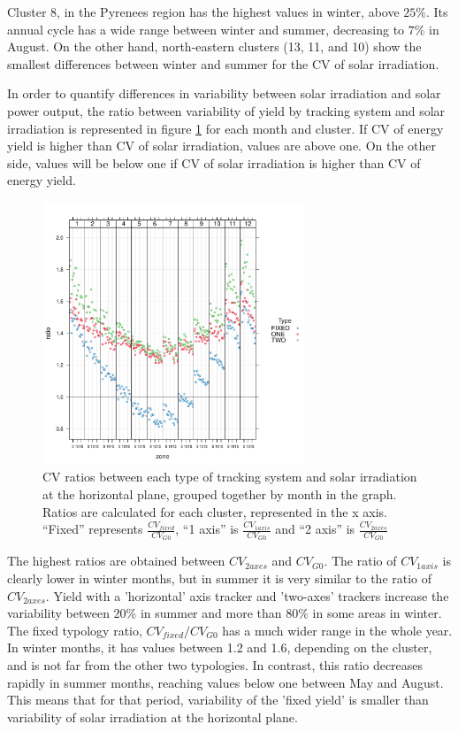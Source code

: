 Cluster 8, in the Pyrenees region has the highest values in winter, above $25\%$. Its annual cycle has a wide range between winter and summer, decreasing to $7\%$ in August. On the other hand, north-eastern clusters (13, 11, and 10) show the smallest differences between winter and summer for the CV of solar irradiation.

In order to quantify differences in variability between solar irradiation and solar power output, the ratio between variability of yield by tracking system and solar irradiation is represented in figure \ref{ratiosCV} for each month and cluster. If CV of energy yield is higher than CV of solar irradiation, values are above one. On the other side, values will be below one if CV of solar irradiation is higher than CV of energy yield. 

\begin{figure}
  \includegraphics[width=0.7\textwidth]{figs/capitulo5/dotplot_ratio_zone2.pdf}
  \caption[CV ratios of PV by tracking type and solar irradiation at horizontal plane]{CV ratios between each type of tracking system and solar irradiation at the horizontal plane, grouped together by month in the graph. Ratios are calculated for each cluster, represented in the x axis. ``Fixed'' represents $\frac{CV_{fixed}}{CV_{G0}}$, ``1 axis'' is $\frac{CV_{1axis}}{CV_{G0}}$ and ``2 axis'' is $\frac{CV_{2axes}}{CV_{G0}}$}
  \label{ratiosCV}
\end{figure}

The highest ratios are obtained between $CV_{2axes}$ and $CV_{G0}$. The ratio of $CV_{1axis}$ is clearly lower in winter months, but in summer it is very similar to the ratio of $CV_{2axes}$. Yield with a 'horizontal' axis tracker and 'two-axes' trackers increase the variability between $20\%$ in summer and more than $80\%$ in some areas in winter. The fixed typology ratio, $CV_{fixed}/CV_{G0}$ has a much wider range in the whole year. In winter months, it has values between 1.2 and 1.6, depending on the cluster, and is not far from the other two typologies. In contrast, this ratio decreases rapidly in summer months, reaching values below one between May and August. This means that for that period, variability of the 'fixed yield' is smaller than variability of solar irradiation at the horizontal plane.

